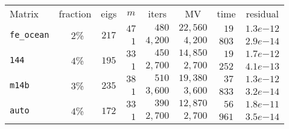 \begin{tabular}{l|c|c|c|c|c|c|c}
\hline
\multirow{2}{*}{Matrix} & \multirow{2}{*}{fraction} & \multirow{2}{*}{eigs} & \multirow{2}{*}{$m$} & \multirow{2}{*}{iters} & \multirow{2}{*}{MV} & \multirow{2}{*}{time} & \multirow{2}{*}{residual} \\
 & & & & & & & \\\hline
\hline
\multirow{2}{*}{\texttt{fe\_ocean}} & \multirow{2}{*}{$\phantom{0}2$\%} & \multirow{2}{*}{$217$} & $47$ & $\phantom{0,{}}480$ & $22,560$ & $\phantom{0}19$ & $1.3e{-12}$ \\
 & & & $\phantom{0}1$ & $4,200$ & $\phantom{0}4,200$ & $803$ & $2.9e{-14}$ \\\hline
\multirow{2}{*}{\texttt{144}} & \multirow{2}{*}{$\phantom{0}4$\%} & \multirow{2}{*}{$195$} & $33$ & $\phantom{0,{}}450$ & $14,850$ & $\phantom{0}19$ & $1.7e{-12}$ \\
 & & & $\phantom{0}1$ & $2,700$ & $\phantom{0}2,700$ & $252$ & $4.1e{-13}$ \\\hline
\multirow{2}{*}{\texttt{m14b}} & \multirow{2}{*}{$\phantom{0}3$\%} & \multirow{2}{*}{$235$} & $38$ & $\phantom{0,{}}510$ & $19,380$ & $\phantom{0}37$ & $1.3e{-12}$ \\
 & & & $\phantom{0}1$ & $3,600$ & $\phantom{0}3,600$ & $833$ & $3.2e{-14}$ \\\hline
\multirow{2}{*}{\texttt{auto}} & \multirow{2}{*}{$\phantom{0}4$\%} & \multirow{2}{*}{$172$} & $33$ & $\phantom{0,{}}390$ & $12,870$ & $\phantom{0}56$ & $1.8e{-11}$ \\
 & & & $\phantom{0}1$ & $2,700$ & $\phantom{0}2,700$ & $961$ & $3.5e{-14}$ \\\hline
\end{tabular}